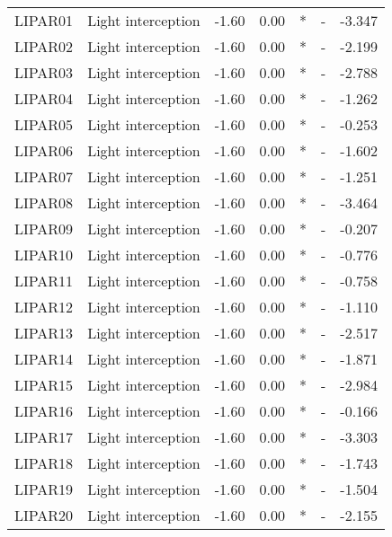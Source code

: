\begin{longtable}{llrrcrr}
    LIPAR01  & Light interception               & -1.60  & 0.00   & *   & -       & -3.347  \\
    LIPAR02  & Light interception               & -1.60  & 0.00   & *   & -       & -2.199  \\
    LIPAR03  & Light interception               & -1.60  & 0.00   & *   & -       & -2.788  \\
    LIPAR04  & Light interception               & -1.60  & 0.00   & *   & -       & -1.262  \\
    LIPAR05  & Light interception               & -1.60  & 0.00   & *   & -       & -0.253  \\
    LIPAR06  & Light interception               & -1.60  & 0.00   & *   & -       & -1.602  \\
    LIPAR07  & Light interception               & -1.60  & 0.00   & *   & -       & -1.251  \\
    LIPAR08  & Light interception               & -1.60  & 0.00   & *   & -       & -3.464  \\
    LIPAR09  & Light interception               & -1.60  & 0.00   & *   & -       & -0.207  \\
    LIPAR10  & Light interception               & -1.60  & 0.00   & *   & -       & -0.776  \\
    LIPAR11  & Light interception               & -1.60  & 0.00   & *   & -       & -0.758  \\
    LIPAR12  & Light interception               & -1.60  & 0.00   & *   & -       & -1.110  \\
    LIPAR13  & Light interception               & -1.60  & 0.00   & *   & -       & -2.517  \\
    LIPAR14  & Light interception               & -1.60  & 0.00   & *   & -       & -1.871  \\
    LIPAR15  & Light interception               & -1.60  & 0.00   & *   & -       & -2.984  \\
    LIPAR16  & Light interception               & -1.60  & 0.00   & *   & -       & -0.166  \\
    LIPAR17  & Light interception               & -1.60  & 0.00   & *   & -       & -3.303  \\
    LIPAR18  & Light interception               & -1.60  & 0.00   & *   & -       & -1.743  \\
    LIPAR19  & Light interception               & -1.60  & 0.00   & *   & -       & -1.504  \\
    LIPAR20  & Light interception               & -1.60  & 0.00   & *   & -       & -2.155  \\
\end{longtable}
